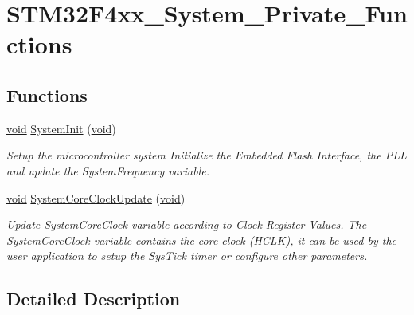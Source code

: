 \hypertarget{group___s_t_m32_f4xx___system___private___functions}{\section{S\-T\-M32\-F4xx\-\_\-\-System\-\_\-\-Private\-\_\-\-Functions}
\label{group___s_t_m32_f4xx___system___private___functions}
}
\subsection*{Functions}
\begin{DoxyCompactItemize}
\item 
\hyperlink{group___n_a_m_e_ga18028b8badbf1ea7e704ccac3c488e82}{void} \hyperlink{group___s_t_m32_f4xx___system___private___functions_ga93f514700ccf00d08dbdcff7f1224eb2}{System\-Init} (\hyperlink{group___n_a_m_e_ga18028b8badbf1ea7e704ccac3c488e82}{void})
\begin{DoxyCompactList}\small\item\em Setup the microcontroller system Initialize the Embedded Flash Interface, the P\-L\-L and update the System\-Frequency variable. \end{DoxyCompactList}\item 
\hyperlink{group___n_a_m_e_ga18028b8badbf1ea7e704ccac3c488e82}{void} \hyperlink{group___s_t_m32_f4xx___system___private___functions_gae0c36a9591fe6e9c45ecb21a794f0f0f}{System\-Core\-Clock\-Update} (\hyperlink{group___n_a_m_e_ga18028b8badbf1ea7e704ccac3c488e82}{void})
\begin{DoxyCompactList}\small\item\em Update System\-Core\-Clock variable according to Clock Register Values. The System\-Core\-Clock variable contains the core clock (H\-C\-L\-K), it can be used by the user application to setup the Sys\-Tick timer or configure other parameters. \end{DoxyCompactList}\end{DoxyCompactItemize}


\subsection{Detailed Description}


